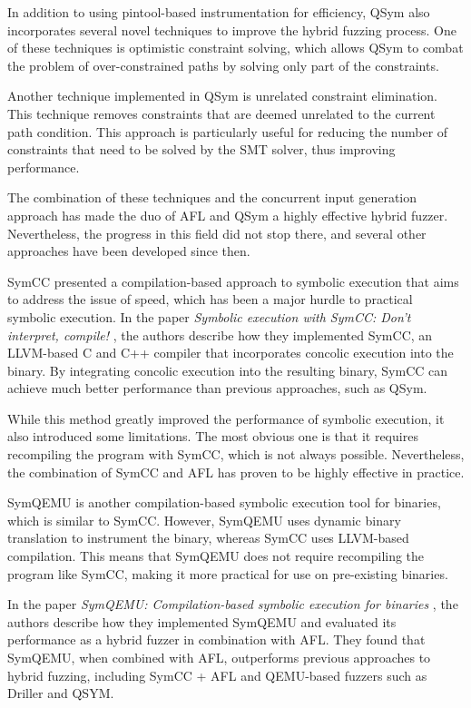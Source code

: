 In addition to using pintool-based instrumentation for efficiency, QSym also incorporates several novel techniques to improve the hybrid fuzzing process. One of these techniques is optimistic constraint solving, which allows QSym to combat the problem of over-constrained paths by solving only part of the constraints.

Another technique implemented in QSym is unrelated constraint elimination. This technique removes constraints that are deemed unrelated to the current path condition. This approach is particularly useful for reducing the number of constraints that need to be solved by the SMT solver, thus improving performance.

The combination of these techniques and the concurrent input generation approach has made the duo of AFL and QSym a highly effective hybrid fuzzer. Nevertheless, the progress in this field did not stop there, and several other approaches have been developed since then.


SymCC presented a compilation-based approach to symbolic execution that aims to address the issue of speed, which has been a major hurdle to practical symbolic execution. In the paper \textit{Symbolic execution with SymCC: Don't interpret, compile!} \cite{symcc-usenix-2020}, the authors describe how they implemented SymCC, an LLVM-based C and C++ compiler that incorporates concolic execution into the binary. By integrating concolic execution into the resulting binary, SymCC can achieve much better performance than previous approaches, such as QSym.

While this method greatly improved the performance of symbolic execution, it also introduced some limitations. The most obvious one is that it requires recompiling the program with SymCC, which is not always possible. Nevertheless, the combination of SymCC and AFL has proven to be highly effective in practice.


SymQEMU is another compilation-based symbolic execution tool for binaries, which is similar to SymCC. However, SymQEMU uses dynamic binary translation to instrument the binary, whereas SymCC uses LLVM-based compilation. This means that SymQEMU does not require recompiling the program like SymCC, making it more practical for use on pre-existing binaries.

In the paper \textit{SymQEMU: Compilation-based symbolic execution for binaries} \cite{symqemu-ndss-2021}, the authors describe how they implemented SymQEMU and evaluated its performance as a hybrid fuzzer in combination with AFL. They found that SymQEMU, when combined with AFL, outperforms previous approaches to hybrid fuzzing, including SymCC + AFL and QEMU-based fuzzers such as Driller and QSYM.

